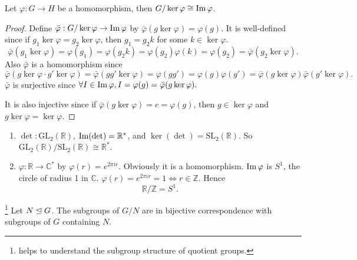 \documentclass[a4paper]{article}
\begin{document}
\begin{theorem}\label{thm:1st isom thm}
  Let $ \varphi:G\to H $ be a homomorphism, then $ G/\ker \varphi
  \cong \operatorname{Im} \varphi $.
\end{theorem}
\begin{proof}
  Define $\bar{\varphi}: G/ \ker \varphi\to \operatorname{Im} \varphi $ by $
  \bar{\varphi}(g \ker \varphi)=\varphi(g) $. It is well-defined
  since if $ g_1 \ker \varphi=g_2 \ker \varphi $, then $ g_1=g_2k $
  for some $k\in \ker \varphi$.
  \[
    \bar{\varphi}(g_1 \ker \varphi)=\varphi(g_1)=\varphi(g_2
    k)=\varphi(g_2)\varphi(k)=\varphi(g_2)=\bar{\varphi}(g_2 \ker \varphi)
  .\]
  Also $ \bar{\varphi} $ is a homomorphism since
  \[
    \bar{\varphi}(g \ker \varphi \cdot g' \ker
    \varphi)=\bar{\varphi}(gg' \ker
    \varphi)=\varphi(gg')=\varphi(g)\varphi(g')=\bar{\varphi}(g \ker
    \varphi) \bar{\varphi}(g '\ker \varphi)
  .\]
  $ \bar{\varphi} $ is surjective since $ \forall I\in \operatorname{Im} \varphi,
  I=\varphi(g)=\bar{\varphi}(g \ker \varphi). $

  It is also injective since if $ \bar{\varphi}(g \ker
  \varphi)=e=\varphi(g) $, then $ g\in \ker \varphi $ and $ g \ker
  \varphi = \ker \varphi $.
\end{proof}
\begin{example}
  \begin{enumerate}
    \item $ \det : \text{GL}_2( \mathbb{R} ) $, $ \operatorname{Im} (\det
      )=\mathbb{R}^* $, and $ \ker (\det )=\text{SL}_2(\mathbb{R} )
      $. So $ \text{GL}_2( \mathbb{R})/ \text{SL}_2( \mathbb{R})
      \cong \mathbb{R}^*.$
    \item $ \varphi: \mathbb{R} \to \mathbb{C}^* $ by $
      \varphi(r)=e^{2\pi ir} $. Obviously it is a homomorphism. $ \operatorname{Im}
      \varphi $ is $S^1$, the circle of radius 1 in $\mathbb{C}$. $
      \varphi(r)=e^{2\pi ir}=1 \Leftrightarrow r\in \mathbb{Z} $. Hence
      \[
        \mathbb{R}/\mathbb{Z}=S^1
      .\]
  \end{enumerate}
\end{example}
\begin{theorem}\label{thm:Correspondence
  theorem}\footnote{helps to understand the subgroup structure of
  quotient groups.}
  Let $ N \trianglelefteq G $. The subgroups of $G/N$ are in bijective
  correspondence with subgroups of $G$ containing $N$.
\end{theorem}
\end{document}
